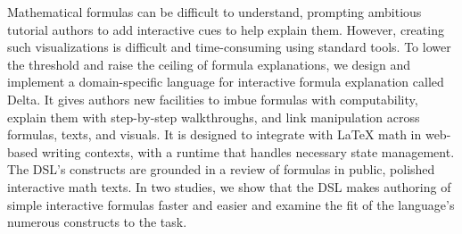 Mathematical formulas can be difficult to understand, prompting ambitious tutorial authors to add interactive cues to help explain them. However, creating such visualizations is difficult and time-consuming using standard tools. To lower the threshold and raise the ceiling of formula explanations, we design and implement a domain-specific language for interactive formula explanation called Delta.  It gives authors new facilities to imbue formulas with computability, explain them with step-by-step walkthroughs, and link manipulation across formulas, texts, and visuals. It is designed to integrate with LaTeX math in web-based writing contexts, with a runtime that handles necessary state management. The DSL's constructs are grounded in a review of formulas in public, polished interactive math texts. In two studies, we show that the DSL makes authoring of simple interactive formulas faster and easier and examine the fit of the language's numerous constructs to the task. 